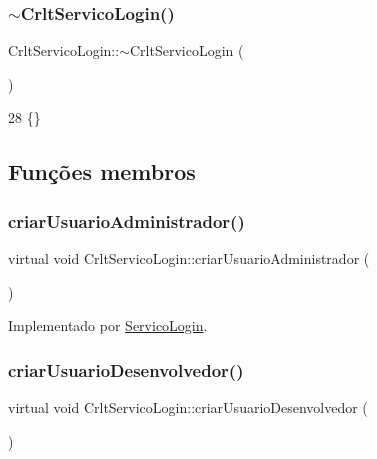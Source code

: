 \subsubsection{\texorpdfstring{$\sim$\+Crlt\+Servico\+Login()}{~CrltServicoLogin()}}
{\footnotesize\ttfamily Crlt\+Servico\+Login\+::$\sim$\+Crlt\+Servico\+Login (\begin{DoxyParamCaption}{ }\end{DoxyParamCaption})\hspace{0.3cm}{\ttfamily [inline]}}


\begin{DoxyCode}
28 \{\}
\end{DoxyCode}


\subsection{Funções membros}
\mbox{\label{class_crlt_servico_login_a49825818fa1e6e24495d6cb9e4236907}} 
\subsubsection{\texorpdfstring{criar\+Usuario\+Administrador()}{criarUsuarioAdministrador()}}
{\footnotesize\ttfamily virtual void Crlt\+Servico\+Login\+::criar\+Usuario\+Administrador (\begin{DoxyParamCaption}{ }\end{DoxyParamCaption})\hspace{0.3cm}{\ttfamily [pure virtual]}}



Implementado por \mbox{\hyperlink{class_servico_login_a2f7e5d945f4ce6b06c8ce093ed3755e7}{Servico\+Login}}.

\mbox{\label{class_crlt_servico_login_aab452ac1f3d0fd6d2f6989017026b188}} 
\subsubsection{\texorpdfstring{criar\+Usuario\+Desenvolvedor()}{criarUsuarioDesenvolvedor()}}
{\footnotesize\ttfamily virtual void Crlt\+Servico\+Login\+::criar\+Usuario\+Desenvolvedor (\begin{DoxyParamCaption}{ }\end{DoxyParamCaption})\hspace{0.3cm}{\ttfamily [pure virtual]}}



